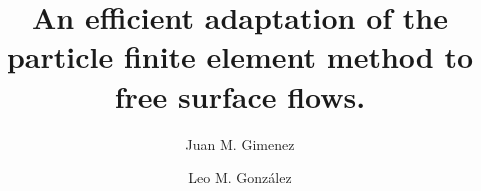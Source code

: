 \documentclass[review]{elsarticle}
\begin{document}
\begin{frontmatter}

\title{An efficient adaptation of the particle finite element method to free surface flows.}


\author[mymainaddress]{Juan M. Gimenez}
\author[mysecondaryaddress]{Leo M. Gonz\'{a}lez}
\address[mymainaddress]{Centro de Investigaci\'on de M\'etodos Computacionales (CIMEC) - UNL/CONICET, Predio Conicet-Santa Fe Colectora Ruta Nac 168 
	      Paraje El Pozo, Santa Fe, Argentina.}
\address[mysecondaryaddress]{Escuela T\'{e}cnica Superior de Ingenieros Navales, Universidad Polit\'{e}cnica de Madrid (ETSIN-UPM), Avd. Arco de la Victoria 4, Madrid, Spain}


\end{frontmatter}
\end{document}
